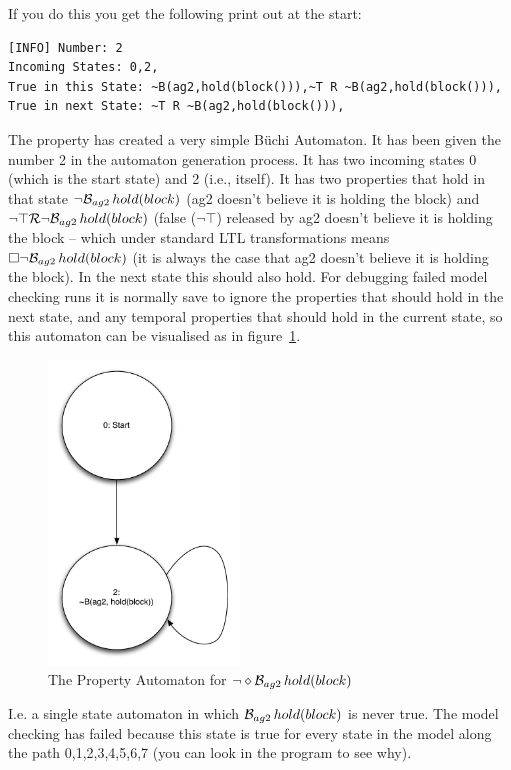 If you do this you get the following print out at the start:

\begin{verbatim}
[INFO] Number: 2
Incoming States: 0,2,
True in this State: ~B(ag2,hold(block())),~T R ~B(ag2,hold(block())),
True in next State: ~T R ~B(ag2,hold(block())),
\end{verbatim}

The property has created a very simple B\"{u}chi Automaton.  It has been given the number 2 in the automaton generation process.  It has two incoming states 0 (which is the start state) and 2 (i.e., itself).  It has two properties that hold in that state $\neg \mathrm{{\cal B}}_{ag2} \, hold(block)$ (ag2 doesn't believe it is holding the block) and $\neg \top {\cal R} \neg \mathrm{{\cal B}}_{ag2} \, hold(block)$ (false ($\neg \top$) released by ag2 doesn't believe it is holding the block -- which under standard LTL transformations means $\Box \neg \mathrm{{\cal B}}_{ag2} \, hold(block)$ (it is always the case that ag2 doesn't believe it is holding the block).  In the next state this should also hold.  For debugging failed model checking runs it is normally save to ignore the properties that should hold in the next state, and any temporal properties that should hold in the current state, so this automaton can be visualised as in figure~\ref{fig:automaton}.

\begin{figure}[htb]
\begin{center}
\includegraphics[width=2in]{images/property_automata.pdf}
\end{center}
\caption{The Property Automaton for $\neg \diamond \mathrm{{\cal B}}_{ag2} \, hold(block)$}
\label{fig:automaton}
\end{figure}

I.e. a single state automaton in which $\mathrm{{\cal B}}_{ag2} \, hold(block)$ is never true.  The model checking has failed because this state is true for every state in the model along the path 0,1,2,3,4,5,6,7 (you can look in the program to see why).

